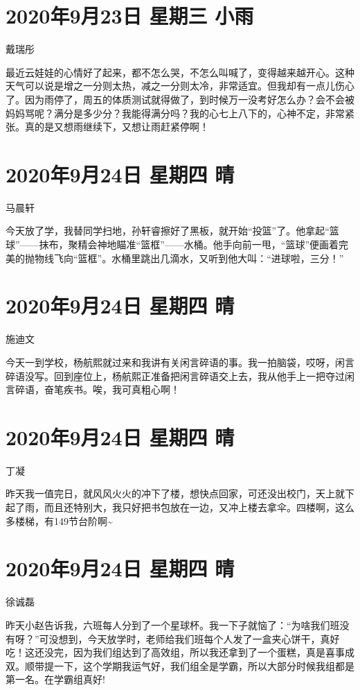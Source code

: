 \section{2020年9月23日 星期三 小雨}

戴瑞彤

最近云娃娃的心情好了起来，都不怎么哭，不怎么叫喊了，变得越来越开心。这种天气可以说是增之一分则太热，减之一分则太冷，非常适宜。但我却有一点儿伤心了。因为雨停了，周五的体质测试就得做了，到时候万一没考好怎么办？会不会被妈妈骂呢？满分是多少分？我能得满分吗？我的心七上八下的，心神不定，非常紧张。真的是又想雨继续下，又想让雨赶紧停啊！

\section{2020年9月24日 星期四 晴}

马晨轩

今天放了学，我替同学扫地，孙轩睿擦好了黑板，就开始“投篮”了。他拿起“篮球”——抹布，聚精会神地瞄准“篮框”——水桶。他手向前一甩，“篮球”便画着完美的抛物线飞向“篮框”。水桶里跳出几滴水，又听到他大叫：“进球啦，三分！”

\section{2020年9月24日 星期四 晴}

施迪文

今天一到学校，杨航熙就过来和我讲有关闲言碎语的事。我一拍脑袋，哎呀，闲言碎语没写。回到座位上，杨航熙正准备把闲言碎语交上去，我从他手上一把夺过闲言碎语，奋笔疾书。唉，我可真粗心啊！

\section{2020年9月24日 星期四 晴}

丁凝

昨天我一值完日，就风风火火的冲下了楼，想快点回家，可还没出校门，天上就下起了雨，而且还特别大，我只好把书包放在一边，又冲上楼去拿伞。四楼啊，这么多楼梯，有149节台阶啊\textasciitilde{}

\section{2020年9月24日 星期四 晴}

徐诚磊

昨天小赵告诉我，六班每人分到了一个星球杯。我一下子就恼了：“为啥我们班没有呀？”可没想到，今天放学时，老师给我们班每个人发了一盒夹心饼干，真好吃！这还没完，因为我们组达到了高效组，所以我还拿到了一个蛋糕，真是喜事成双。顺带提一下，这个学期我运气好，我们组全是学霸，所以大部分时候我组都是第一名。在学霸组真好!

